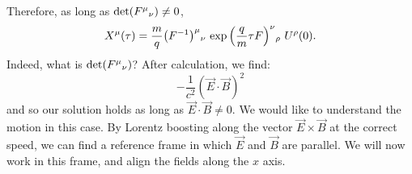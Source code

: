 \documentclass[../Main.tex]{subfiles}
\begin{document}
Therefore, as long as $\det(\indx{F}{\mu}{\nu}) \neq 0$,
\begin{equation*}
    X^\mu(\tau) = \frac{m}{q} \indx{\left(F^{-1}\right)}{\mu}{\nu}~\indx{\exp\left(\frac{q}{m} \tau F\right)}{\nu}{\rho}~U^\rho(0).
\end{equation*}
Indeed, what is $\det(\indx{F}{\mu}{\nu})$? After calculation, we find:
\begin{equation*}
    -\frac1{c^2} \left(\vec{E} \cdot \vec{B}\right)^2
\end{equation*}
and so our solution holds as long as $\vec{E} \cdot \vec{B} \neq 0$. We would like to understand the motion in this case. By Lorentz boosting along the vector $\vec{E} \times \vec{B}$ at the correct speed, we can find a reference frame in which $\vec{E}$ and $\vec{B}$ are parallel. We will now work in this frame, and align the fields along the $x$ axis.
\end{document}
